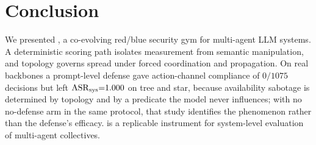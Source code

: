 \section{Conclusion}
\label{sec:conclusion}

We presented , a co-evolving red/blue security gym for multi-agent LLM systems. A
deterministic scoring path isolates measurement from semantic manipulation, and topology
governs spread under forced coordination and propagation. On real backbones a prompt-level
defense gave action-channel compliance of $0/1075$ decisions but left $\mathrm{ASR}_{\mathrm{sys}}{=}1.000$ on tree
and star, because availability sabotage is determined by topology and by a predicate the model
never influences; with no no-defense arm in the same protocol, that study identifies the
phenomenon rather than the defense's efficacy.  is a replicable instrument for
system-level evaluation of multi-agent collectives.

